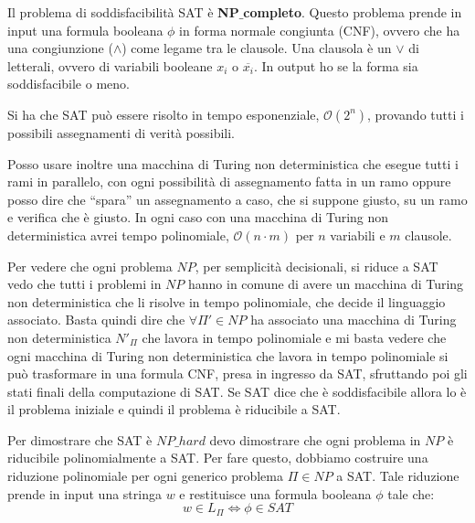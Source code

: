 \begin{teorema}
    Il problema di soddisfacibilità SAT è \textbf{NP}$\_$\textbf{completo}.
    Questo problema prende in input una formula booleana $\phi$ in forma normale
    congiunta (CNF), ovvero che ha una congiunzione ($\land$) come legame tra le
    clausole. Una clausola è un $\lor$ di letterali, ovvero di variabili booleane
    $x_i$ o $\overline{x_i}$. In output ho se la forma sia soddisfacibile o meno.
\end{teorema}
\begin{dimostrazione}
    Si ha che SAT può essere risolto in tempo esponenziale, $\mathcal{O}(2^n)$,
    provando tutti i possibili assegnamenti di verità possibili.

    Posso usare inoltre una macchina di Turing non deterministica che esegue
    tutti i rami in parallelo, con ogni possibilità di assegnamento fatta in un
    ramo oppure posso dire che “spara” un assegnamento a caso, che si suppone
    giusto, su un ramo e verifica che è giusto. In ogni caso con una macchina di
    Turing non deterministica avrei tempo polinomiale, $\mathcal{O}(n \cdot m)$
    per $n$ variabili e $m$ clausole.

    Per vedere che ogni problema $NP$, per semplicità decisionali, si riduce a SAT
    vedo che tutti i problemi in $NP$ hanno in comune di avere un macchina di
    Turing non deterministica che li risolve in tempo polinomiale, che decide il
    linguaggio associato. Basta quindi dire che $\forall \Pi ' \in  NP$ ha
    associato una macchina di Turing non deterministica $N'_{\Pi}$ che lavora in
    tempo polinomiale e mi basta vedere che ogni macchina di Turing non
    deterministica che lavora in tempo polinomiale si può trasformare in una
    formula CNF, presa in ingresso da SAT, sfruttando poi gli stati finali della
    computazione di SAT. Se SAT dice che è soddisfacibile allora lo è il problema
    iniziale e quindi il problema è riducibile a SAT.
\end{dimostrazione}
\begin{dimostrazione}
    Per dimostrare che SAT è $NP\_hard$ devo dimostrare che ogni problema in $NP$
    è riducibile polinomialmente a SAT. Per fare questo, dobbiamo costruire una
    riduzione polinomiale per ogni generico problema $\Pi \in NP$ a SAT. Tale
    riduzione prende in input una stringa $w$ e restituisce una formula booleana
    $\phi$ tale che:
    \begin{equation}
        w \in L_{\Pi} \iff \phi \in SAT
    \end{equation}
\end{dimostrazione}
